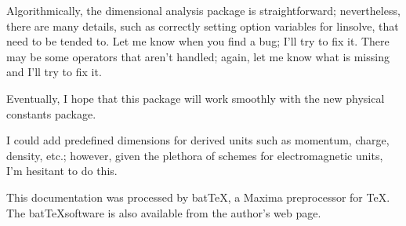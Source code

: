 \documentclass[12pt]{article}
\begin{document}
Algorithmically, the dimensional analysis package is straightforward; 
nevertheless, there are many details, such as correctly setting
option variables for linsolve, that need to be tended to.  Let me know 
when you find a bug; I'll try to fix it.  There may be some operators that
aren't handled; again, let me know what is missing and I'll try
to fix it.

Eventually, I hope that this package will work smoothly with the new physical 
constants package. 

I could add predefined dimensions for derived units such as momentum, charge, 
density, etc.; however, given the plethora of schemes for
electromagnetic units, I'm hesitant to do this.

This documentation was processed by bat\TeX, a Maxima preprocessor
for \TeX. The bat\TeX software is also available from the author's
web page.
\end{document}
